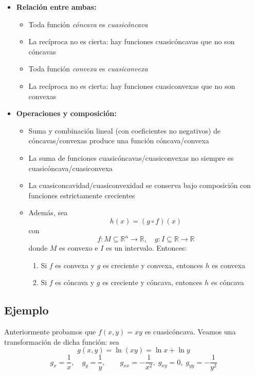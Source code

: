 \documentclass{article}
\begin{document}
\begin{itemize}
  \item \textbf{Relación entre ambas:}
    \begin{itemize}
      \item Toda función \emph{cóncava} es \emph{cuasicóncava}
      \item La recíproca no es cierta: hay funciones cuasicóncavas que no son cóncavas
      \item Toda función \emph{convexa} es \emph{cuasiconvexa}
      \item La recíproca no es cierta: hay funciones cuasiconvexas que no son convexas
    \end{itemize}

  \item \textbf{Operaciones y composición:}
    \begin{itemize}
      \item Suma y combinación lineal (con coeficientes no negativos) de cóncavas/convexas produce una función cóncava/convexa
      \item La suma de funciones cuasicóncavas/cuasiconvexas no siempre es cuasicóncava/cuasiconvexa
      \item La cuasiconcavidad/cuasiconvexidad se conserva bajo composición con funciones estrictamente crecientes
      \item Además, sea
      \[
        h(x) = (g\circ f)(x)
      \]
      con
      \[
        f\colon M\subseteq\mathbb{R}^n\to\mathbb{R},
        \quad
        g\colon I\subseteq\mathbb{R}\to\mathbb{R}
      \]
      donde \(M\) es convexo e \(I\) es un intervalo. Entonces:
      \begin{enumerate}
        \item Si \(f\) es convexa y \(g\) es creciente y convexa, entonces \(h\) es convexa
        \item Si \(f\) es cóncava y \(g\) es creciente y cóncava, entonces \(h\) es cóncava
      \end{enumerate}
    \end{itemize}
\end{itemize}

\subsection*{Ejemplo}

Anteriormente probamos que \(f(x,y)=xy\) es cuasicóncava. Veamos una transformación de dicha función: sea
\[
g(x,y)=\ln(xy)=\ln x+\ln y
\]
\[
g_x=\frac1x,\quad g_y=\frac1y,
\qquad
g_{xx}=-\frac1{x^2},\;g_{xy}=0,\;g_{yy}=-\frac1{y^2}
\]
\end{document}
